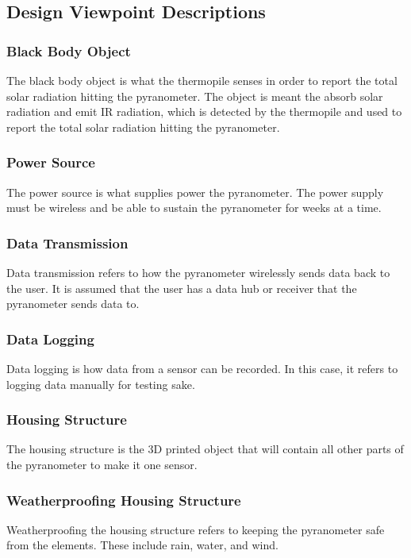\documentclass[10pt,draftclsnofoot,onecolumn,letterpaper]{article}
\begin{document}
\subsection{Design Viewpoint Descriptions}
\subsubsection{Black Body Object}
The black body object is what the thermopile senses in order to report the total solar radiation hitting the pyranometer. The object is meant the absorb solar radiation and emit IR radiation, which is detected by the thermopile and used to report the total solar radiation hitting the pyranometer.

\subsubsection{Power Source}
The power source is what supplies power the pyranometer. The power supply must be wireless and be able to sustain the pyranometer for weeks at a time.

\subsubsection{Data Transmission}
Data transmission refers to how the pyranometer wirelessly sends data back to the user. It is assumed that the user has a data hub or receiver that the pyranometer sends data to.

\subsubsection{Data Logging}
Data logging is how data from a sensor can be recorded. In this case, it refers to logging data manually for testing sake.

\subsubsection{Housing Structure}
The housing structure is the 3D printed object that will contain all other parts of the pyranometer to make it one sensor. 

\subsubsection{Weatherproofing Housing Structure}
Weatherproofing the housing structure refers to keeping the pyranometer safe from the elements. These include rain, water, and wind. 
\end{document}
